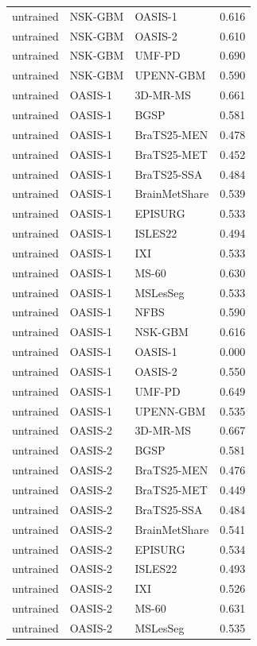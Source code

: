 \begin{tabular}{lllr}
untrained & NSK-GBM & OASIS-1 & 0.616 \\
untrained & NSK-GBM & OASIS-2 & 0.610 \\
untrained & NSK-GBM & UMF-PD & 0.690 \\
untrained & NSK-GBM & UPENN-GBM & 0.590 \\
untrained & OASIS-1 & 3D-MR-MS & 0.661 \\
untrained & OASIS-1 & BGSP & 0.581 \\
untrained & OASIS-1 & BraTS25-MEN & 0.478 \\
untrained & OASIS-1 & BraTS25-MET & 0.452 \\
untrained & OASIS-1 & BraTS25-SSA & 0.484 \\
untrained & OASIS-1 & BrainMetShare & 0.539 \\
untrained & OASIS-1 & EPISURG & 0.533 \\
untrained & OASIS-1 & ISLES22 & 0.494 \\
untrained & OASIS-1 & IXI & 0.533 \\
untrained & OASIS-1 & MS-60 & 0.630 \\
untrained & OASIS-1 & MSLesSeg & 0.533 \\
untrained & OASIS-1 & NFBS & 0.590 \\
untrained & OASIS-1 & NSK-GBM & 0.616 \\
untrained & OASIS-1 & OASIS-1 & 0.000 \\
untrained & OASIS-1 & OASIS-2 & 0.550 \\
untrained & OASIS-1 & UMF-PD & 0.649 \\
untrained & OASIS-1 & UPENN-GBM & 0.535 \\
untrained & OASIS-2 & 3D-MR-MS & 0.667 \\
untrained & OASIS-2 & BGSP & 0.581 \\
untrained & OASIS-2 & BraTS25-MEN & 0.476 \\
untrained & OASIS-2 & BraTS25-MET & 0.449 \\
untrained & OASIS-2 & BraTS25-SSA & 0.484 \\
untrained & OASIS-2 & BrainMetShare & 0.541 \\
untrained & OASIS-2 & EPISURG & 0.534 \\
untrained & OASIS-2 & ISLES22 & 0.493 \\
untrained & OASIS-2 & IXI & 0.526 \\
untrained & OASIS-2 & MS-60 & 0.631 \\
untrained & OASIS-2 & MSLesSeg & 0.535 \\

\end{tabular}
